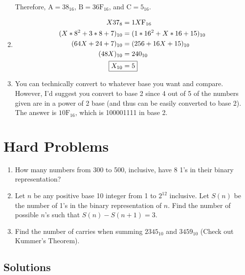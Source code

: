 \documentclass[12pt]{article}
\begin{document}
\begin{enumerate}
Therefore, $\text{A} = 38_{16}$, $\boxed{\text{B} = \text{36F}_{16}}$, and $\text{C} = 5_{16}$.

\item
\begin{align*}
X37_8 &= 1X\text{F}_{16}\\
(X * 8^2 + 3 * 8 + 7)_{10} &= (1 * 16^2 + X * 16 + 15)_{10}\\
(64X + 24 + 7)_{10} &= (256 + 16X + 15)_{10}\\
(48X)_{10} &= 240_{10}\\
\Aboxed{X_{10} &= 5}
\end{align*}

\item
You can technically convert to whatever base you want and compare. 
However, I'd suggest you convert to base 2 since 4 out of 5 of the numbers given are in a power of 2 base
(and thus can be easily converted to base 2).
The answer is $\boxed{\text{10F}_{16}}$, which is 100001111 in base 2.

\end{enumerate}


\section{Hard Problems}

\begin{enumerate}

\item
How many numbers from 300 to 500, inclusive, have 8 1's in their binary representation?

\item
Let $n$ be any positive base 10 integer from 1 to $2^{12}$ inclusive. 
Let $S(n)$ be the number of 1's in the binary representation of $n$.
Find the number of possible $n$'s such that $S(n) - S(n + 1) = 3$.

\item
Find the number of carries when summing $2345_{10}$ and $3459_{10}$ 
(Check out Kummer's Theorem).

\end{enumerate}


\subsection{Solutions}
\end{document}
